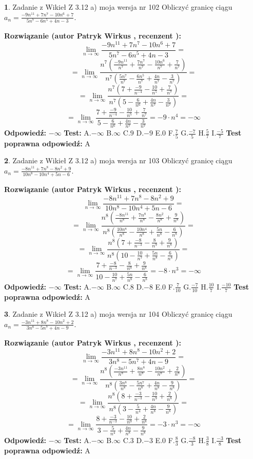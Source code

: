 \documentclass[12pt, a4paper]{article}
\theoremstyle{definition} %
\newtheorem{zad}{}
\newcommand{\zadStart}[1]{\begin{zad}#1\newline}
\newcommand{\zadStop}{\end{zad}}
\newcommand{\rozwStart}[2]{\noindent \textbf{Rozwiązanie (autor #1 , recenzent #2): }\newline}
\newcommand{\rozwStop}{\newline}
\newcommand{\odpStart}{\noindent \textbf{Odpowiedź:}\newline}
\newcommand{\odpStop}{\newline}
\newcommand{\testStart}{\noindent \textbf{Test:}\newline}
\newcommand{\testStop}{\newline}
\newcommand{\kluczStart}{\noindent \textbf{Test poprawna odpowiedź:}\newline}
\newcommand{\kluczStop}{\newline}
\begin{document}
\zadStart{Zadanie z Wikieł Z 3.12 a) moja wersja nr 102}
Obliczyć granicę ciągu $a_{n}=\frac{-9n^{11}+7n^{7}-10n^{6}+7}{5n^{7}-6n^{5}+4n-3}$.
\zadStop
\rozwStart{Patryk Wirkus}{}
$$\lim\limits_{n\to\infty}\frac{-9n^{11}+7n^{7}-10n^{6}+7}{5n^{7}-6n^{5}+4n-3}=$$
$$=\lim\limits_{n\to\infty}\frac{n^{7}\left(\frac{-9n^{11}}{n^{7}}+\frac{7n^{7}}{n^{7}}-\frac{10n^{6}}{n^{7}}+\frac{7}{n^{7}}\right)}{n^{7}\left(\frac{5n^{7}}{n^{7}}-\frac{6n^{5}}{n^{7}}+\frac{4n}{n^{7}}-\frac{3}{n^{7}}\right)}=$$
$$=\lim\limits_{n\to\infty}\frac{n^{7}\left(7+\frac{-9}{n^{-4}}-\frac{10}{n^{5}}+\frac{7}{n^{7}}\right)}
{n^{7}\left(5-\frac{6}{n^{6}}+\frac{4n}{n^{7}}-\frac{3}{n^{7}}\right)}=$$
$$=\lim\limits_{n\to\infty}\frac{7+\frac{-9}{n^{-4}}-\frac{10}{n^{5}}+\frac{7}{n^{7}}}{5-\frac{6}{n^{6}}+\frac{4n}{n^{7}}-\frac{3}{n^{7}}}=-9\cdot n^{4} = -\infty$$
\rozwStop
\odpStart
$-\infty$
\odpStop
\testStart
A.$-\infty$
B.$\infty$
C.$9$
D.$-9$
E.$0$
F.$\frac{7}{5}$
G.$\frac{-7}{5}$
H.$\frac{5}{7}$
I.$\frac{-5}{7}$
\testStop
\kluczStart
A
\kluczStop



\zadStart{Zadanie z Wikieł Z 3.12 a) moja wersja nr 103}
Obliczyć granicę ciągu $a_{n}=\frac{-8n^{11}+7n^{8}-8n^{2}+9}{10n^{8}-10n^{4}+5n-6}$.
\zadStop
\rozwStart{Patryk Wirkus}{}
$$\lim\limits_{n\to\infty}\frac{-8n^{11}+7n^{8}-8n^{2}+9}{10n^{8}-10n^{4}+5n-6}=$$
$$=\lim\limits_{n\to\infty}\frac{n^{8}\left(\frac{-8n^{11}}{n^{8}}+\frac{7n^{8}}{n^{8}}-\frac{8n^{2}}{n^{8}}+\frac{9}{n^{8}}\right)}{n^{8}\left(\frac{10n^{8}}{n^{8}}-\frac{10n^{4}}{n^{8}}+\frac{5n}{n^{8}}-\frac{6}{n^{8}}\right)}=$$
$$=\lim\limits_{n\to\infty}\frac{n^{8}\left(7+\frac{-8}{n^{-3}}-\frac{8}{n^{9}}+\frac{9}{n^{8}}\right)}
{n^{8}\left(10-\frac{10}{n^{7}}+\frac{5n}{n^{8}}-\frac{6}{n^{8}}\right)}=$$
$$=\lim\limits_{n\to\infty}\frac{7+\frac{-8}{n^{-3}}-\frac{8}{n^{9}}+\frac{9}{n^{8}}}{10-\frac{10}{n^{7}}+\frac{5n}{n^{8}}-\frac{6}{n^{8}}}=-8\cdot n^{3} = -\infty$$
\rozwStop
\odpStart
$-\infty$
\odpStop
\testStart
A.$-\infty$
B.$\infty$
C.$8$
D.$-8$
E.$0$
F.$\frac{7}{10}$
G.$\frac{-7}{10}$
H.$\frac{10}{7}$
I.$\frac{-10}{7}$
\testStop
\kluczStart
A
\kluczStop



\zadStart{Zadanie z Wikieł Z 3.12 a) moja wersja nr 104}
Obliczyć granicę ciągu $a_{n}=\frac{-3n^{11}+8n^{8}-10n^{2}+2}{3n^{8}-5n^{7}+4n-9}$.
\zadStop
\rozwStart{Patryk Wirkus}{}
$$\lim\limits_{n\to\infty}\frac{-3n^{11}+8n^{8}-10n^{2}+2}{3n^{8}-5n^{7}+4n-9}=$$
$$=\lim\limits_{n\to\infty}\frac{n^{8}\left(\frac{-3n^{11}}{n^{8}}+\frac{8n^{8}}{n^{8}}-\frac{10n^{2}}{n^{8}}+\frac{2}{n^{8}}\right)}{n^{8}\left(\frac{3n^{8}}{n^{8}}-\frac{5n^{7}}{n^{8}}+\frac{4n}{n^{8}}-\frac{9}{n^{8}}\right)}=$$
$$=\lim\limits_{n\to\infty}\frac{n^{8}\left(8+\frac{-3}{n^{-3}}-\frac{10}{n^{9}}+\frac{2}{n^{8}}\right)}
{n^{8}\left(3-\frac{5}{n^{4}}+\frac{4n}{n^{8}}-\frac{9}{n^{8}}\right)}=$$
$$=\lim\limits_{n\to\infty}\frac{8+\frac{-3}{n^{-3}}-\frac{10}{n^{9}}+\frac{2}{n^{8}}}{3-\frac{5}{n^{4}}+\frac{4n}{n^{8}}-\frac{9}{n^{8}}}=-3\cdot n^{3} = -\infty$$
\rozwStop
\odpStart
$-\infty$
\odpStop
\testStart
A.$-\infty$
B.$\infty$
C.$3$
D.$-3$
E.$0$
F.$\frac{8}{3}$
G.$\frac{-8}{3}$
H.$\frac{3}{8}$
I.$\frac{-3}{8}$
\testStop
\kluczStart
A
\kluczStop
\end{document}
